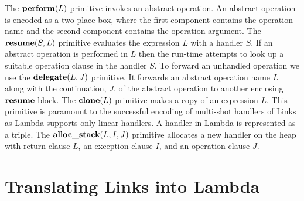 \documentclass[12pt,mscres,cdtppar,twoside,openright,logo,rightchapter,normalheadings]{infthesis}
\theoremstyle{definition}
\begin{document}
The $\textbf{perform}(L)$ primitive invokes an abstract operation. An abstract
operation is encoded as a two-place box, where the first component
contains the operation name and the second component contains the
operation argument.
%
The $\textbf{resume}(S,L)$ primitive evaluates the expression $L$ with a
handler $S$. If an abstract operation is performed in $L$ then the
run-time attempts to look up a suitable operation clause in the
handler $S$. To forward an unhandled operation we use the
$\textbf{delegate}(L,J)$ primitive. It forwards an abstract operation name $L$
along with the continuation, $J$, of the abstract operation to another
enclosing $\textbf{resume}$-block.
%
The $\textbf{clone}(L)$ primitive makes a copy of an expression $L$. This
primitive is paramount to the successful encoding of multi-shot
handlers of Links as Lambda supports only linear handlers.
%
A handler in Lambda is represented as a triple. The $\textbf{alloc\_stack}(L,I,J)$
primitive allocates a new handler on the heap with return clause $L$,
an exception clause $I$, and an operation clause $J$.


\section{Translating Links into Lambda}
\label{sec:translation}

\newcommand{\trans}[1]{\llbracket #1 \rrbracket}

\newcommand{\mtrans}[1]{\mathcal{M}\left(#1\right)}
\newcommand{\vtrans}[1]{\mathcal{V}\left(#1\right)}
\newcommand{\htrans}[1]{\mathcal{H}\left(#1\right)}
\newcommand{\hptrans}[1]{\mathcal{H}^{op}\left(#1\right)}
\end{document}
